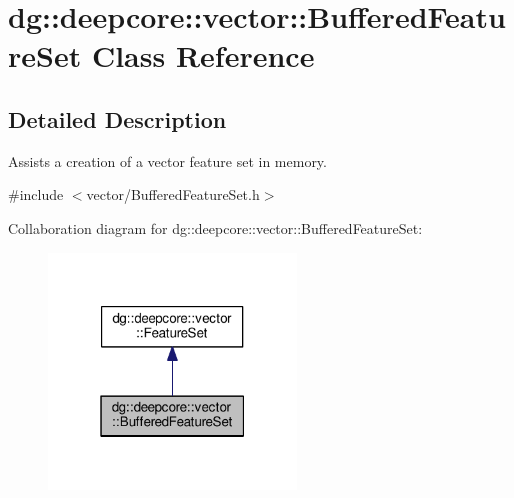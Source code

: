 \hypertarget{classdg_1_1deepcore_1_1vector_1_1_buffered_feature_set}{}\section{dg\+:\+:deepcore\+:\+:vector\+:\+:Buffered\+Feature\+Set Class Reference}
\label{classdg_1_1deepcore_1_1vector_1_1_buffered_feature_set}


\subsection{Detailed Description}
Assists a creation of a vector feature set in memory. 

{\ttfamily \#include $<$vector/\+Buffered\+Feature\+Set.\+h$>$}



Collaboration diagram for dg\+:\+:deepcore\+:\+:vector\+:\+:Buffered\+Feature\+Set\+:
\nopagebreak
\begin{figure}[H]
\begin{center}
\leavevmode
\includegraphics[width=187pt]{classdg_1_1deepcore_1_1vector_1_1_buffered_feature_set__coll__graph}
\end{center}
\end{figure}
